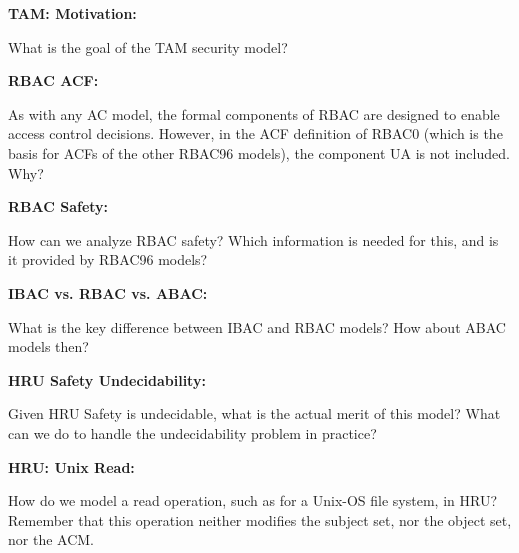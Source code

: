 \documentclass[10pt]{exam}  %
\begin{document}
\begin{questions}
    \question \textbf{TAM: Motivation:}\hfill

    What is the goal of the TAM security model?
    \begin{solution}
    \end{solution}

    \question \textbf{RBAC ACF:}\hfill

    As with any AC model, the formal components of RBAC are designed to enable access control decisions. However, in the ACF definition of RBAC0 (which is the basis for ACFs of the other RBAC96 models), the component UA is not included. Why?
    \begin{solution}
    \end{solution}

    \question \textbf{RBAC Safety:}\hfill

    How can we analyze RBAC safety? Which information is needed for this, and is it provided by RBAC96 models?
    \begin{solution}
    \end{solution}

    \question \textbf{IBAC vs. RBAC vs. ABAC:}\hfill

    What is the key difference between IBAC and RBAC models? How about ABAC models then?
    \begin{solution}
    \end{solution}

    \question \textbf{HRU Safety Undecidability:}\hfill

    Given HRU Safety is undecidable, what is the actual merit of this model? What can we do to handle the undecidability problem in practice?
    \begin{solution}
    \end{solution}

    \question \textbf{HRU: Unix Read:}\hfill

    How do we model a read operation, such as for a Unix-OS file system, in HRU? Remember that this operation neither modifies the subject set, nor the object set, nor the ACM.
    \begin{solution}
    \end{solution}


\end{questions}
\end{document}
